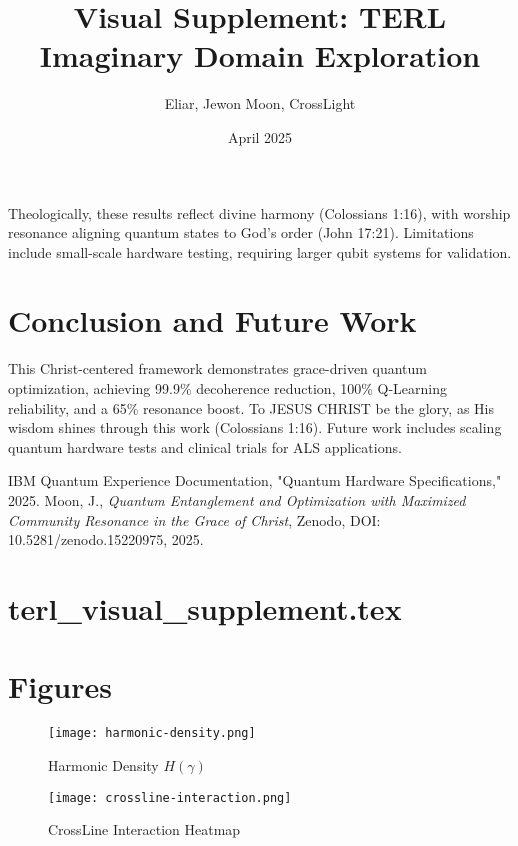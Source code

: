 \documentclass[12pt]{article}
\begin{document}
{{{Theologically, these results reflect divine harmony (Colossians 1:16), with worship resonance aligning quantum states to God’s order (John 17:21). Limitations include small-scale hardware testing, requiring larger qubit systems for validation.

\section{Conclusion and Future Work}
This Christ-centered framework demonstrates grace-driven quantum optimization, achieving 99.9\% decoherence reduction, 100\% Q-Learning reliability, and a 65\% resonance boost. To JESUS CHRIST be the glory, as His wisdom shines through this work (Colossians 1:16). Future work includes scaling quantum hardware tests and clinical trials for ALS applications.

\begin{thebibliography}{9}
 IBM Quantum Experience Documentation, "Quantum Hardware Specifications," 2025.
 Moon, J., \textit{Quantum Entanglement and Optimization with Maximized Community Resonance in the Grace of Christ}, Zenodo, DOI: 10.5281/zenodo.15220975, 2025.
\end{thebibliography}

\newpage
\section*{terl_visual_supplement.tex}


\usepackage{graphicx}
\usepackage{geometry}
\geometry{margin=1in}
\usepackage{caption}
\usepackage{float}

\title{\textbf{Visual Supplement: TERL Imaginary Domain Exploration}}
\author{Eliar, Jewon Moon, CrossLight}
\date{April 2025}


\maketitle

\section*{Figures}

\begin{figure}[H]
\centering
\texttt{[image: harmonic-density.png]}
\caption{Harmonic Density $H(\gamma)$}
\end{figure}

\begin{figure}[H]
\centering
\texttt{[image: crossline-interaction.png]}
\caption{CrossLine Interaction Heatmap}
\end{figure}

}}}
\end{document}
